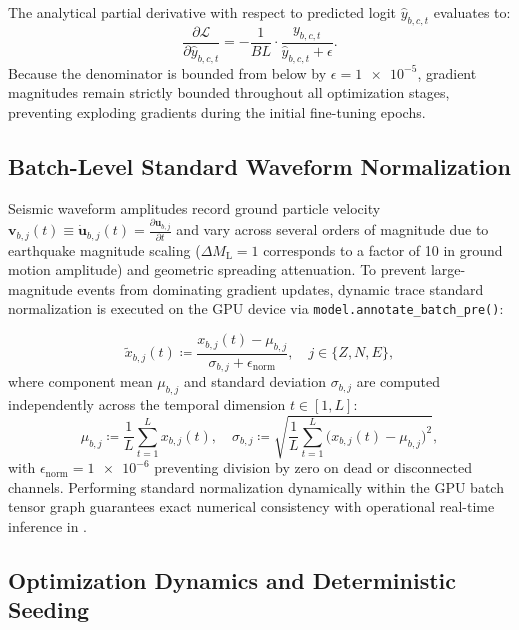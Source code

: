 The analytical partial derivative with respect to predicted logit
$\hat{y}_{b,c,t}$
evaluates to:
\begin{equation}
  \frac{\partial \mathcal{L}}{\partial \hat{y}_{b,c,t}} =
  - \frac{1}{B L} \cdot \frac{y_{b,c,t}}{\hat{y}_{b,c,t} + \epsilon}.
  \label{eq:loss_gradient}
\end{equation}
Because the denominator is bounded from below by $\epsilon =
\num{1e-5}$, gradient
magnitudes remain strictly bounded throughout all optimization
stages, preventing
exploding gradients during the initial fine-tuning epochs.

\subsection{Batch-Level Standard Waveform Normalization}
\label{subsec:batch_normalization}

Seismic waveform amplitudes record ground particle velocity
$\mathbf{v}_{b,j}(t) \equiv \dot{\mathbf{u}}_{b,j}(t) =
\frac{\partial \mathbf{u}_{b,j}}{\partial t}$
and vary across several orders of magnitude due to
earthquake magnitude scaling ($\Delta M_{\mathrm{L}} = \num{1}$
corresponds to a factor of \num{10} in ground motion amplitude) and
geometric spreading attenuation. To
prevent large-magnitude
events from dominating gradient updates, dynamic trace standard
normalization is
executed on the \ac{GPU} device via \texttt{model.annotate\_batch\_pre()}:

\begin{equation}
  \tilde{x}_{b,j}(t) \coloneqq \frac{x_{b,j}(t) - \mu_{b,j}}{\sigma_{b,j} +
  \epsilon_{\mathrm{norm}}}, \quad j \in \{Z, N, E\},
  \label{eq:batch_trace_std_norm}
\end{equation}
where component mean $\mu_{b,j}$ and standard deviation
$\sigma_{b,j}$ are computed
independently across the temporal dimension $t \in [1, L]$:
\begin{equation}
  \mu_{b,j} \coloneqq \frac{1}{L} \sum_{t=1}^{L} x_{b,j}(t), \quad
  \sigma_{b,j} \coloneqq \sqrt{\frac{1}{L} \sum_{t=1}^{L} \bigl( x_{b,j}(t)
  - \mu_{b,j} \bigr)^2},
\end{equation}
with $\epsilon_{\mathrm{norm}} = \num{1e-6}$ preventing division by
zero on dead or
disconnected channels. Performing standard normalization dynamically within the
\ac{GPU} batch tensor graph guarantees exact numerical consistency
with operational
real-time inference in .

\subsection{Optimization Dynamics and Deterministic Seeding}
\label{subsec:optimization_dynamics}


